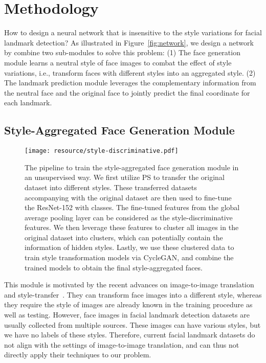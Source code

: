 \documentclass[10pt,twocolumn,letterpaper]{article}
\begin{document}
\section{Methodology}

How to design a neural network that is insensitive to the style variations for facial landmark detection?
As illustrated in Figure~\ref{fig:network}, we design a network by combine two sub-modules to solve this problem:
(1) The face generation module learns a neutral style of face images to combat the effect of style variations, i.e., transform faces with different styles into an aggregated style.
(2) The landmark prediction module leverages the complementary information from the neutral face and the original face to jointly predict the final coordinate for each landmark.



\subsection{Style-Aggregated Face Generation Module}\label{sec:style-module}


\begin{figure}[t]
\center
\texttt{[image: resource/style-discriminative.pdf]}
\caption{
The pipeline to train the style-aggregated face generation module in an unsupervised way. We first utilize PS to transfer the original dataset into  different styles. These transferred datasets accompanying with the original dataset are then used to fine-tune the ResNet-152 with  classes.
The fine-tuned features from the global average pooling layer can be considered as the style-discriminative features.
We then leverage these features to cluster all images in the original dataset into  clusters, which can potentially contain the information of hidden styles.
Lastly, we use these clustered data to train style transformation models via CycleGAN, and combine the trained models to obtain the final style-aggregated faces.
}
\vspace{-2mm}
\label{fig:pipeline}
\end{figure}



This module is motivated by the recent advances on image-to-image translation~\cite{isola2016image,CycleGAN2017} and style-transfer~\cite{dumoulin2016learned,gatys2016image,ulyanov2016texture}.
They can transform face images into a different style, whereas they require the style of images are already known in the training procedure as well as testing.
However, face images in facial landmark detection datasets are usually collected from multiple sources.
These images can have various styles, but we have no labels of these styles.
Therefore, current facial landmark datasets do not align with the settings of image-to-image translation, and can thus not directly apply their techniques to our problem.
\end{document}
